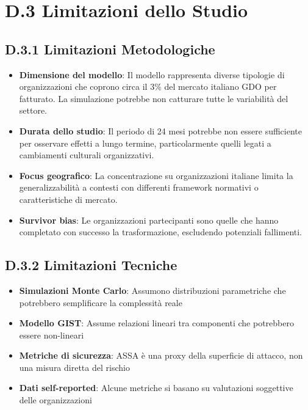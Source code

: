 \section{\texorpdfstring{\textbf{D.3 Limitazioni dello Studio}}{D.3 - Limitazioni dello Studio}}

\subsection{\texorpdfstring{\textbf{D.3.1 Limitazioni Metodologiche}}{D.3.1 - Limitazioni Metodologiche}}

\begin{itemize}
    \item \textbf{Dimensione del modello}: Il modello rappresenta diverse tipologie di organizzazioni che coprono circa il 3\% del mercato italiano GDO per fatturato. La simulazione potrebbe non catturare tutte le variabilità del settore.
    
    \item \textbf{Durata dello studio}: Il periodo di 24 mesi potrebbe non essere sufficiente per osservare effetti a lungo termine, particolarmente quelli legati a cambiamenti culturali organizzativi.
    
    \item \textbf{Focus geografico}: La concentrazione su organizzazioni italiane limita la generalizzabilità a contesti con differenti framework normativi o caratteristiche di mercato.
    
    \item \textbf{Survivor bias}: Le organizzazioni partecipanti sono quelle che hanno completato con successo la trasformazione, escludendo potenziali fallimenti.
\end{itemize}

\subsection{\texorpdfstring{\textbf{D.3.2 Limitazioni Tecniche}}{D.3.2 - Limitazioni Tecniche}}

\begin{itemize}
    \item \textbf{Simulazioni Monte Carlo}: Assumono distribuzioni parametriche che potrebbero semplificare la complessità reale
    \item \textbf{Modello GIST}: Assume relazioni lineari tra componenti che potrebbero essere non-lineari
    \item \textbf{Metriche di sicurezza}: ASSA è una proxy della superficie di attacco, non una misura diretta del rischio
    \item \textbf{Dati self-reported}: Alcune metriche si basano su valutazioni soggettive delle organizzazioni
\end{itemize}

